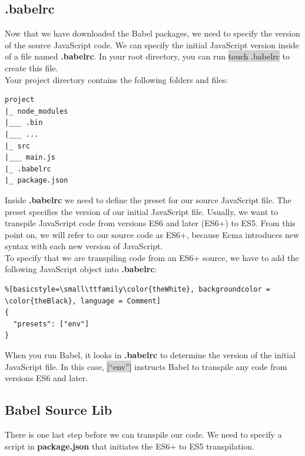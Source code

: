 \documentclass[11pt]{article}
\begin{document}
\subsection{.babelrc}
Now that we have downloaded the Babel packages, we need to specify the version of the source JavaScript code. We can specify the initial JavaScript version inside of a file named \textbf{.babelrc}. In your root directory, you can run \colorbox{lightgray}{touch .babelrc} to create this file. \\
\newline
Your project directory contains the following folders and files:
\begin{lstlisting}[basicstyle=\small\ttfamily\color{theWhite}, backgroundcolor = \color{theBlack}, language = Comment]
project
|_ node_modules
|___ .bin
|___ ...
|_ src 
|___ main.js
|_ .babelrc
|_ package.json
\end{lstlisting}

Inside \textbf{.babelrc} we need to define the preset for our source JavaScript file. The preset specifies the version of our initial JavaScript file. Usually, we want to transpile JavaScript code from versions ES6 and later (ES6+) to ES5. From this point on, we will refer to our source code as ES6+, because Ecma introduces new syntax with each new version of JavaScript. \\
\newline
To specify that we are transpiling code from an ES6+ source, we have to add the following JavaScript object into \textbf{.babelrc}:
\begin{lstlisting}%[basicstyle=\small\ttfamily\color{theWhite}, backgroundcolor = \color{theBlack}, language = Comment]
{
  "presets": ["env"]
}
\end{lstlisting}
When you run Babel, it looks in \textbf{.babelrc} to determine the version of the initial JavaScript file. In this case, \colorbox{lightgray}{[``env'']} instructs Babel to transpile any code from versions ES6 and later.

\subsection{Babel Source Lib}
There is one last step before we can transpile our code. We need to specify a script in \textbf{package.json} that initiates the ES6+ to ES5 transpilation. 
\end{document}
